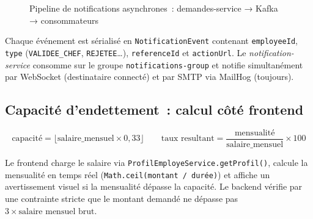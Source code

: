 \begin{figure}[H]
\centering
{}
\caption{Pipeline de notifications asynchrones~: demandes-service → Kafka → consommateurs}
\label{fig:kafka}
\end{figure}

Chaque événement est sérialisé en \texttt{NotificationEvent} contenant
\texttt{employeeId}, \texttt{type} (\texttt{VALIDEE\_CHEF}, \texttt{REJETEE}…),
\texttt{referenceId} et \texttt{actionUrl}. Le \textit{notification-service}
consomme sur le groupe \texttt{notifications-group} et notifie simultanément par
WebSocket (destinataire connecté) et par SMTP via MailHog (toujours).

\subsection{Capacité d'endettement~: calcul côté frontend}

\begin{equation}
  \text{capacité} = \lfloor \text{salaire\_mensuel} \times 0{,}33 \rfloor
  \qquad
  \text{taux resultant} = \frac{\text{mensualité}}{\text{salaire\_mensuel}} \times 100
\end{equation}

Le frontend charge le salaire via \texttt{ProfilEmployeService.getProfil()},
calcule la mensualité en temps réel (\texttt{Math.ceil(montant / durée)}) et
affiche un avertissement visuel si la mensualité dépasse la capacité. Le backend
vérifie par une contrainte stricte que le montant demandé ne dépasse pas
$3 \times \text{salaire mensuel brut}$.

